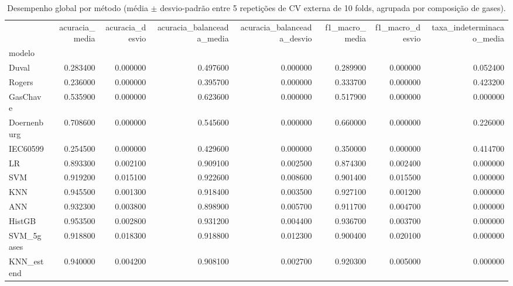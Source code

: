\begin{table}[htbp]
\centering
\caption{Desempenho global por método (média $\pm$ desvio-padrão entre 5 repetições de CV externa de 10 folds, agrupada por composição de gases).}
\begin{tabular}{lrrrrrrr}
\toprule
 & acuracia\_media & acuracia\_desvio & acuracia\_balanceada\_media & acuracia\_balanceada\_desvio & f1\_macro\_media & f1\_macro\_desvio & taxa\_indeterminacao\_media \\
modelo &  &  &  &  &  &  &  \\
\midrule
Duval & 0.283400 & 0.000000 & 0.497600 & 0.000000 & 0.289900 & 0.000000 & 0.052400 \\
Rogers & 0.236000 & 0.000000 & 0.395700 & 0.000000 & 0.333700 & 0.000000 & 0.423200 \\
GasChave & 0.535900 & 0.000000 & 0.623600 & 0.000000 & 0.517900 & 0.000000 & 0.000000 \\
Doernenburg & 0.708600 & 0.000000 & 0.545600 & 0.000000 & 0.660000 & 0.000000 & 0.226000 \\
IEC60599 & 0.254500 & 0.000000 & 0.429600 & 0.000000 & 0.350000 & 0.000000 & 0.414700 \\
LR & 0.893300 & 0.002100 & 0.909100 & 0.002500 & 0.874300 & 0.002400 & 0.000000 \\
SVM & 0.919200 & 0.015100 & 0.922600 & 0.008600 & 0.901400 & 0.015500 & 0.000000 \\
KNN & 0.945500 & 0.001300 & 0.918400 & 0.003500 & 0.927100 & 0.001200 & 0.000000 \\
ANN & 0.932300 & 0.003800 & 0.898900 & 0.005700 & 0.911700 & 0.004700 & 0.000000 \\
HistGB & 0.953500 & 0.002800 & 0.931200 & 0.004400 & 0.936700 & 0.003700 & 0.000000 \\
SVM\_5gases & 0.918800 & 0.018300 & 0.918800 & 0.012300 & 0.900400 & 0.020100 & 0.000000 \\
KNN\_estend & 0.940000 & 0.004200 & 0.908100 & 0.002700 & 0.920300 & 0.005000 & 0.000000 \\
\bottomrule
\end{tabular}

\end{table}
